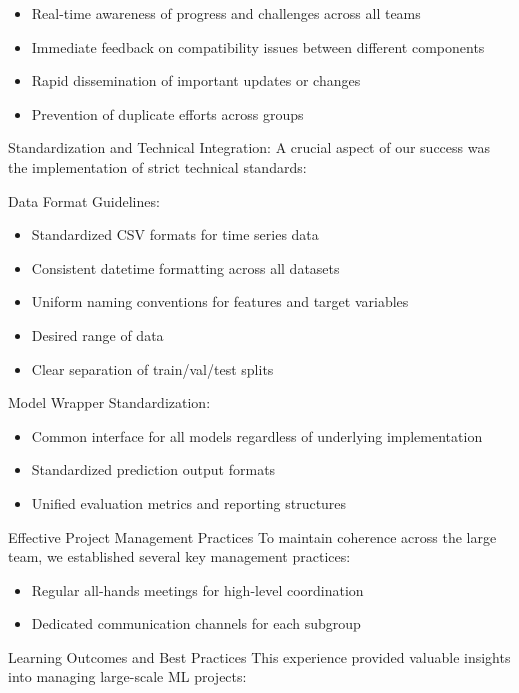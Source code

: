 \documentclass[a4paper]{article}
\providecommand{\tightlist}{%
      \setlength{\itemsep}{0pt}\setlength{\parskip}{0pt}}
\begin{document}
\begin{itemize}
\tightlist
\item
  Real-time awareness of progress and challenges across all teams
\item
  Immediate feedback on compatibility issues between different
  components
\item
  Rapid dissemination of important updates or changes
\item
  Prevention of duplicate efforts across groups
\end{itemize}

Standardization and Technical Integration: A crucial aspect of our
success was the implementation of strict technical standards:

Data Format Guidelines:

\begin{itemize}
\tightlist
\item
  Standardized CSV formats for time series data
\item
  Consistent datetime formatting across all datasets
\item
  Uniform naming conventions for features and target variables
\item
  Desired range of data
\item
  Clear separation of train/val/test splits
\end{itemize}

Model Wrapper Standardization:

\begin{itemize}
\tightlist
\item
  Common interface for all models regardless of underlying
  implementation
\item
  Standardized prediction output formats
\item
  Unified evaluation metrics and reporting structures
\end{itemize}

Effective Project Management Practices To maintain coherence across the
large team, we established several key management practices:

\begin{itemize}
\tightlist
\item
  Regular all-hands meetings for high-level coordination
\item
  Dedicated communication channels for each subgroup
\end{itemize}

Learning Outcomes and Best Practices This experience provided valuable
insights into managing large-scale ML projects:
\end{document}
